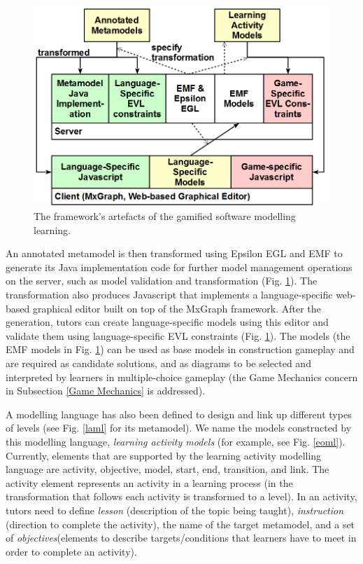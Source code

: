 \documentclass[conference]{IEEEtran}
\begin{document}
\begin{figure}[t!]
\centering
\includegraphics[width=\linewidth]{artefacts}
\caption{The framework's artefacts of the gamified software modelling learning.}
\label{artefacts}
\end{figure}


An annotated metamodel is then transformed using Epsilon EGL \cite{kolovos2010epsilon} and EMF \cite{steinberg2008emf} to generate its Java implementation code for further model management operations on the server, such as model validation and transformation (Fig. \ref{artefacts}). The transformation also produces Javascript that implements a language-specific web-based graphical editor built on top of the MxGraph framework. After the generation, tutors can create language-specific models using this editor and validate them using language-specific EVL \cite{kolovos2006eclipse} constraints (Fig. \ref{artefacts}). The models (the EMF models in Fig. \ref{artefacts}) can be used as base models in construction gameplay and are required as candidate solutions, and as diagrams to be selected and interpreted by learners in multiple-choice gameplay (the Game Mechanics concern in Subsection \ref{Game Mechanics} is addressed).  

A modelling language has also been defined to design and link up different types of levels (see Fig. \ref{laml} for its metamodel). We name the models constructed by this modelling language, \emph{learning activity models} (for example, see Fig. \ref{eoml}). Currently, elements that are supported by the learning activity modelling language are activity, objective, model, start, end, transition, and link. The activity element represents an activity in a learning process (in the transformation that follows each activity is transformed to a level). In an activity, tutors need to define \emph{lesson} (description of the topic being taught), \emph{instruction} (direction to complete the activity), the name of the target metamodel, and a set of \emph{objectives}(elements to describe targets/conditions that learners have to meet in order to complete an activity). 
\end{document}

